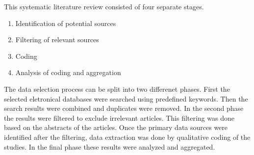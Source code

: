 This systematic literature review consisted of four separate stages.

\begin{enumerate}
	\item{Identification of potential sources}
	\item{Filtering of relevant sources}
	\item{Coding}
	\item{Analysis of coding and aggregation}
\end{enumerate}

The data selection process can be split into two differenet phases.
First the selected eletronical databases were searched using predefined
keywords. Then the search results were combined and duplicates were
removed. In the second phase the results were filtered to exclude
irrelevant articles. This filtering was done based on the abstracts
of the articles. Once the primary data sources were identified after
the filtering, data extraction was done by qualitative coding of the
studies. In the final phase these results were analyzed and aggregated.
